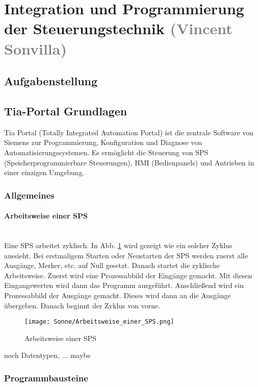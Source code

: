 \section{Integration und Programmierung der Steuerungstechnik \textcolor{gray}{ (Vincent Sonvilla)}}


\subsection{Aufgabenstellung}

\subsection{Tia-Portal Grundlagen}

Tia Portal (Totally Integrated Automation Portal) ist die zentrale Software von Siemens zur Programmierung, Konfiguration und Diagnose von Automatisierungssystemen. Es ermöglicht die Steuerung von SPS (Speicherprogrammierbare Steuerungen), HMI (Bedienpanels) und Antrieben in einer einzigen Umgebung.

    \subsubsection{Allgemeines}

        \paragraph{Arbeitsweise einer SPS} \mbox{} \\
        Eine SPS arbeitet zyklisch. In Abb. \ref{Arbeitsweise_einer_SPS} wird gezeigt wie ein solcher Zyklus aussieht. Bei erstmaligem Starten oder Neustarten der SPS werden zuerst alle Ausgänge, Merker, etc. auf Null gesetzt. Danach startet die zyklische Arbeitsweise. Zuerst wird eine Prozessabbild der Eingänge gemacht. Mit diesen Eingangswerten wird dann das Programm ausgeführt. Anschließend wird ein Prozessabbild der Ausgänge gemacht. Dieses wird dann an die Ausgänge übergeben. Danach beginnt der Zyklus von vorne. \cite{Arbeitsweise_der_SPS}
        \begin{figure}[h]
            \texttt{[image: Sonne/Arbeitsweise\_einer\_SPS.png]}
            \caption{Arbeitsweise einer SPS \cite{Arbeitsweise_der_SPS}}
            \label{Arbeitsweise_einer_SPS}
        \end{figure}

        noch Datentypen, ... maybe

    \subsubsection{Programmbausteine}
    

